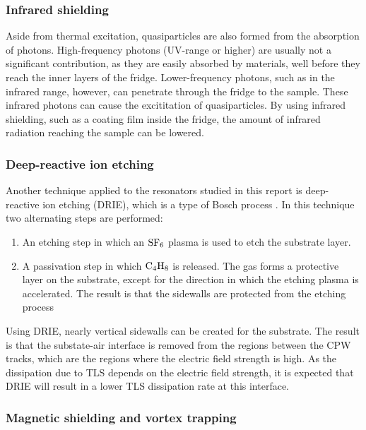 \subsubsection{Infrared shielding}

Aside from thermal excitation, quasiparticles are also formed from the absorption of photons. High-frequency photons (UV-range or higher) are usually not a significant contribution, as they are easily absorbed by materials, well before they reach the inner layers of the fridge. Lower-frequency photons, such as in the infrared range, however, can penetrate through the fridge to the sample. These infrared photons can cause the excititation of quasiparticles. By using infrared shielding, such as a coating film inside the fridge, the amount of infrared radiation reaching the sample can be lowered.



\subsubsection{Deep-reactive ion etching}

Another technique applied to the resonators studied in this report is deep-reactive ion etching (DRIE), which is a type of Bosch process \cite{DRIE}. In this technique two alternating steps are performed:

\begin{enumerate}
    \item An etching step in which an $\mathrm{SF_6}$ plasma is used to etch the substrate layer.
    \item A passivation step in which $\mathrm{C_4H_8}$ is released. The gas forms a protective layer on the substrate, except for the direction in which the etching plasma is accelerated. The result is that the sidewalls are protected from the etching process
\end{enumerate}

Using DRIE, nearly vertical sidewalls can be created for the substrate. The result is that the substate-air interface is removed from the regions between the CPW tracks, which are the regions where the electric field strength is high. As the dissipation due to TLS depends on the electric field strength, it is expected that DRIE will result in a lower TLS dissipation rate at this interface.

\subsubsection{Magnetic shielding and vortex trapping}

